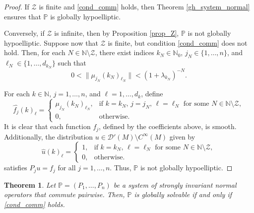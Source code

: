 \documentclass{amsart}
\newtheorem{theorem}{Theorem}[section]
\theoremstyle{definition}
\theoremstyle{remark}
\numberwithin{equation}{section}
\begin{document}
	\begin{proof}
		If $\mathcal{Z}$ is finite and \eqref{cond_comm} holds, then Theorem \ref{gh_system_normal} ensures that $\mathbb{P}$ is globally hypoelliptic.
		
		Conversely, if $\mathcal{Z}$ is infinite, then by Proposition \ref{prop_Z}, $\mathbb{P}$ is not globally hypoelliptic. Suppose now that $\mathcal{Z}$ is finite, but condition \eqref{cond_comm} does not hold. Then, for each $N\in\mathbb{N}\setminus\mathcal{Z}$, there exist indices $k_N\in\mathbb{N}_0$, $j_N\in\{1,\dots,n\}$, and $\ell_N\in\{1,\dots,d_{k_N}\}$ such that
		\begin{equation*}
			0<\|\mu_{j_N}(k_N)_{\ell_N}\|<(1+\lambda_{k_N})^{-N}.
		\end{equation*}
		
		For each $k\in\mathbb{N}$, $j=1,\dots,n$, and $\ell=1,\dots,d_k$, define  
		\begin{equation*}
			\widehat{f_j}(k)_\ell=\begin{cases}
				\mu_{j_N}(k_N)_{\ell_N}, & \text{if } k=k_N,\, j=j_N,\, \ell=\ell_N \text{ for some } N\in\mathbb{N}\setminus\mathcal{Z},\\
				0, & \text{otherwise.}
			\end{cases}
		\end{equation*}
		It is clear that each function \( f_j \), defined by the coefficients above, is smooth. Additionally, the distribution \( u \in \mathscr{D}'(M)\setminus C^\infty(M) \) given by
		\begin{equation*}
			\widehat{u}(k)_\ell =\begin{cases}
				1, & \text{if } k=k_N,\, \ell=\ell_N \text{ for some } N\in\mathbb{N}\setminus\mathcal{Z},\\
				0, & \text{otherwise.}
			\end{cases}
		\end{equation*}
		satisfies \( P_j u = f_j \) for all \( j=1,\dots,n \). Thus, $\mathbb{P}$ is not globally hypoelliptic.
	\end{proof}
	
	\begin{theorem}
		Let $\mathbb{P}=(P_1,\dots,P_n)$ be a system of strongly invariant normal operators that commute pairwise. Then, $\mathbb{P}$ is globally solvable if and only if \eqref{cond_comm} holds.
	\end{theorem}
	
\end{document}
